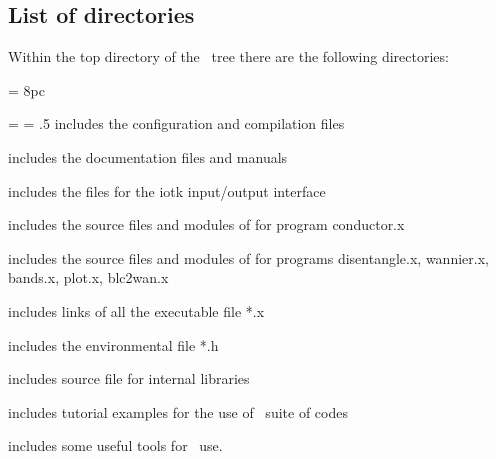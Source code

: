 \subsection{List of directories}
Within the top directory of the \WANT\ tree there are the
following directories:

\newdimen\descindent \descindent = 8pc
{\noindent \leftskip = \descindent \parskip = .5\baselineskip
{}%
includes the configuration and compilation files\par

\noindent{}%
includes the documentation files and manuals \par

\noindent{}%
includes the files for the iotk input/output interface \par

\noindent{}%
includes the source files and modules of for program conductor.x
\par

\noindent{}%
includes the source files and modules of for programs
disentangle.x, wannier.x, bands.x, plot.x, blc2wan.x \par

\noindent{}%
includes links of all the executable file *.x \par

\noindent{}%
includes the environmental file *.h \par

\noindent{}%
includes source file for internal libraries \par

\noindent{}%
includes tutorial examples for the use of \WANT\ suite of
codes\par

\noindent{}%
includes some useful tools for \WANT\ use. \par}
